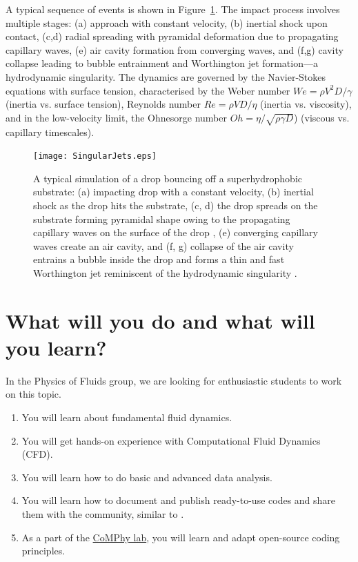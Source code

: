 \documentclass[11pt]{article}
\begin{document}
A typical sequence of events is shown in Figure~\ref{Figure::Typical}. The impact process involves multiple stages: (a) approach with constant velocity, (b) inertial shock upon contact, (c,d) radial spreading with pyramidal deformation due to propagating capillary waves, (e) air cavity formation from converging waves, and (f,g) cavity collapse leading to bubble entrainment and Worthington jet formation—a hydrodynamic singularity. The dynamics are governed by the Navier-Stokes equations with surface tension, characterised by the Weber number $We = \rho V^2D/\gamma$ (inertia vs. surface tension), Reynolds number $Re = \rho VD/\eta$ (inertia vs. viscosity), and in the low-velocity limit, the Ohnesorge number $Oh = \eta/\sqrt{\rho\gamma D}$) (viscous vs. capillary timescales).

\begin{figure}[H]
\begin{center}
 \texttt{[image: SingularJets.eps]}
 \caption{A typical simulation of a drop bouncing off a superhydrophobic substrate: (a) impacting drop with a constant velocity, (b) inertial shock as the drop hits the substrate, (c, d) the drop spreads on the substrate forming pyramidal shape owing to the propagating capillary waves on the surface of the drop \citep{renardy2003pyramidal, zhang2022impact}, (e) converging capillary waves create an air cavity, and (f, g) collapse of the air cavity entrains a bubble inside the drop and forms a thin and fast Worthington jet reminiscent of the hydrodynamic singularity \citep{Bartolo2006Singular}.}
 \label{Figure::Typical}
\end{center}

\end{figure}
\section*{What will you do and what will you learn?}
In the Physics of Fluids group, we are looking for enthusiastic students to work on this topic.
\begin{enumerate}
\itemsep0em
\item You will learn about fundamental fluid dynamics.
\item You will get hands-on experience with Computational Fluid Dynamics (CFD).
\item You will learn how to do basic and advanced data analysis.
\item You will learn how to document and publish ready-to-use codes and share them with the community, similar to \citet{basiliskVatsal, basiliskVatsalDropFilm, basiliskVatsalViscousBouncing}. 
\item As a part of the \href{https://comphy-lab.org}{CoMPhy lab}, you will learn and adapt open-source coding principles. 
\end{enumerate}
\end{document}
